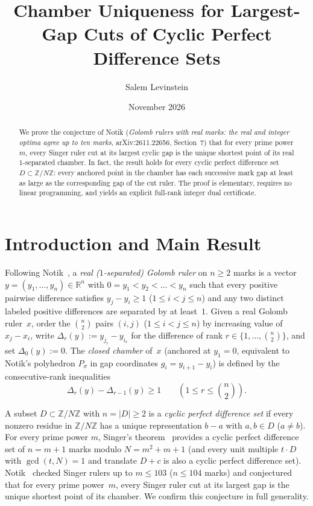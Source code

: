 \documentclass[11pt]{article}
\title{Chamber Uniqueness for Largest-Gap Cuts of Cyclic Perfect Difference Sets}
\author{Salem Levinstein}
\date{November 2026}
\begin{document}
\maketitle

\begin{abstract}
We prove the conjecture of Notik (\emph{Golomb rulers with real marks: the real and integer optima agree up to ten marks}, arXiv:2611.22656, Section~7) that for every prime power $m$, every Singer ruler cut at its largest cyclic gap is the unique shortest point of its real $1$-separated chamber. In fact, the result holds for every cyclic perfect difference set $D \subset \mathbb{Z}/N\mathbb{Z}$: every anchored point in the chamber has each successive mark gap at least as large as the corresponding gap of the cut ruler. The proof is elementary, requires no linear programming, and yields an explicit full-rank integer dual certificate.
\end{abstract}

\section{Introduction and Main Result}

Following Notik~\cite{Notik2026}, a \emph{real ($1$-separated) Golomb ruler} on $n \ge 2$ marks is a vector $y = (y_1, \dots, y_n) \in \mathbb{R}^n$ with $0 = y_1 < y_2 < \dots < y_n$ such that every positive pairwise difference satisfies $y_j - y_i \ge 1$ ($1 \le i < j \le n$) and any two distinct labeled positive differences are separated by at least~$1$. Given a real Golomb ruler~$x$, order the $\binom{n}{2}$ pairs $(i, j)$ ($1 \le i < j \le n$) by increasing value of $x_j - x_i$, write $\Delta_r(y) := y_{j_r} - y_{i_r}$ for the difference of rank $r \in \{1, \dots, \binom{n}{2}\}$, and set $\Delta_0(y) := 0$. The \emph{closed chamber} of~$x$ (anchored at $y_1 = 0$, equivalent to Notik's polyhedron $P_\sigma$ in gap coordinates $g_i = y_{i+1} - y_i$) is defined by the consecutive-rank inequalities
\begin{equation}\label{eq:chamber}
\Delta_r(y) - \Delta_{r-1}(y) \ge 1 \qquad \left(1 \le r \le \binom{n}{2}\right).
\end{equation}

A subset $D \subset \mathbb{Z}/N\mathbb{Z}$ with $n = |D| \ge 2$ is a \emph{cyclic perfect difference set} if every nonzero residue in $\mathbb{Z}/N\mathbb{Z}$ has a unique representation $b - a$ with $a, b \in D$ ($a \neq b$). For every prime power $m$, Singer's theorem~\cite{Singer1938} provides a cyclic perfect difference set of $n = m + 1$ marks modulo $N = m^2 + m + 1$ (and every unit multiple $t \cdot D$ with $\gcd(t, N) = 1$ and translate $D + c$ is also a cyclic perfect difference set). Notik~\cite[Section~7]{Notik2026} checked Singer rulers up to $m \le 103$ ($n \le 104$ marks) and conjectured that for every prime power~$m$, every Singer ruler cut at its largest gap is the unique shortest point of its chamber. We confirm this conjecture in full generality.
\end{document}
